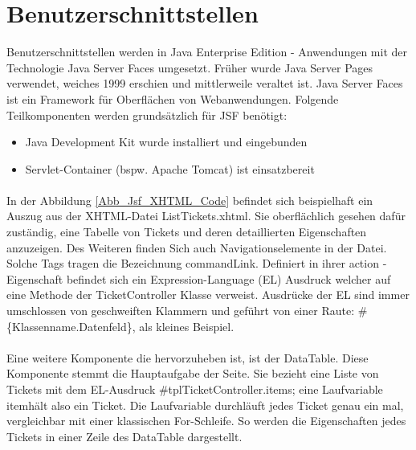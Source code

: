 \section{Benutzerschnittstellen}
\label{jsf}
Benutzerschnittstellen werden in Java Enterprise Edition - Anwendungen mit der Technologie \glqq Java Server Faces \grqq umgesetzt. Früher wurde \glqq Java Server Pages \grqq verwendet, weiches 1999 erschien und mittlerweile veraltet ist. Java Server Faces ist ein Framework für Oberflächen von Webanwendungen. Folgende Teilkomponenten werden grundsätzlich für JSF benötigt:

\begin{itemize}
	\item Java Development Kit wurde installiert und eingebunden
	\item Servlet-Container (bspw. Apache Tomcat) ist einsatzbereit
\end{itemize}
\paragraph{}
In der Abbildung \ref{Abb_Jsf_XHTML_Code} befindet sich beispielhaft ein Auszug aus der XHTML-Datei ListTickets.xhtml. Sie oberflächlich gesehen dafür zuständig, eine Tabelle von Tickets und deren detaillierten Eigenschaften anzuzeigen. Des Weiteren finden Sich auch Navigationselemente in der Datei. Solche Tags tragen die Bezeichnung \glqq commandLink\grqq. Definiert in ihrer \glqq action \grqq -Eigenschaft befindet sich ein Expression-Language (EL) Ausdruck welcher auf eine Methode der TicketController Klasse verweist. Ausdrücke der EL sind immer umschlossen von geschweiften Klammern und geführt von einer Raute: \#\{Klassenname.Datenfeld\}, als kleines Beispiel.
\paragraph{}
Eine weitere Komponente die hervorzuheben ist, ist der DataTable. Diese Komponente stemmt die Hauptaufgabe der Seite. Sie bezieht eine Liste von Tickets mit dem EL-Ausdruck \glqq \#{tplTicketController.items}\grqq; eine Laufvariable \glqq item\grqq hält also ein Ticket. Die Laufvariable durchläuft jedes Ticket genau ein mal, vergleichbar mit einer klassischen For-Schleife. So werden die Eigenschaften jedes Tickets in einer Zeile des DataTable dargestellt.

